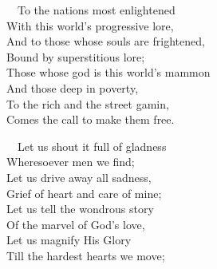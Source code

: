 \documentclass[
]{book}
\begin{document}
~~To the nations most enlightened\\
\hspace*{0.333em}\hspace*{0.333em}With this world's progressive lore,\\
\hspace*{0.333em}\hspace*{0.333em}And to those whose souls are frightened,\\
\hspace*{0.333em}\hspace*{0.333em}Bound by superstitious lore;\\
\hspace*{0.333em}\hspace*{0.333em}Those whose god is this world's mammon\\
\hspace*{0.333em}\hspace*{0.333em}And those deep in poverty,\\
\hspace*{0.333em}\hspace*{0.333em}To the rich and the street gamin,\\
\hspace*{0.333em}\hspace*{0.333em}Comes the call to make them free.

~~Let us shout it full of gladness\\
\hspace*{0.333em}\hspace*{0.333em}Wheresoever men we find;\\
\hspace*{0.333em}\hspace*{0.333em}Let us drive away all sadness,\\
\hspace*{0.333em}\hspace*{0.333em}Grief of heart and care of mine;\\
\hspace*{0.333em}\hspace*{0.333em}Let us tell the wondrous story\\
\hspace*{0.333em}\hspace*{0.333em}Of the marvel of God's love,\\
\hspace*{0.333em}\hspace*{0.333em}Let us magnify His Glory\\
\hspace*{0.333em}\hspace*{0.333em}Till the hardest hearts we move;
\end{document}
